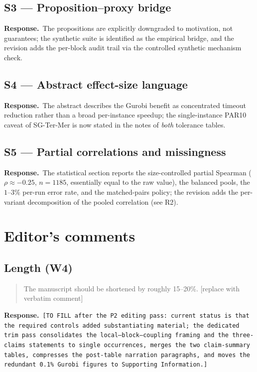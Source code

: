\documentclass[11pt]{article}
\newenvironment{reviewerquote}%
  {\medskip\noindent\color{quotegray}\itshape\begin{quotation}\noindent}%
  {\end{quotation}\medskip}
\newcommand{\resp}{\noindent\textbf{Response.}\ }
\begin{document}
\subsection*{S3 --- Proposition--proxy bridge}
\resp The propositions are explicitly downgraded to motivation, not guarantees; the
synthetic suite is identified as the empirical bridge, and the revision adds the
per-block audit trail via the controlled synthetic mechanism check.

\subsection*{S4 --- Abstract effect-size language}
\resp The abstract describes the Gurobi benefit as concentrated timeout reduction rather
than a broad per-instance speedup; the single-instance PAR10 caveat of SG-Ter-Mer is now
stated in the notes of \emph{both} tolerance tables.

\subsection*{S5 --- Partial correlations and missingness}
\resp The statistical section reports the size-controlled partial Spearman
($\rho\approx-0.25$, $n=1185$, essentially equal to the raw value), the balanced pools,
the $1$--$3\%$ per-run error rate, and the matched-pairs policy; the revision adds the
per-variant decomposition of the pooled correlation (see R2).

\section*{Editor's comments}

\subsection*{Length (W4)}
\begin{reviewerquote}
The manuscript should be shortened by roughly 15--20\%. [replace with verbatim comment]
\end{reviewerquote}
\resp \texttt{[TO FILL after the P2 editing pass: current status is that the required
controls added substantiating material; the dedicated trim pass consolidates the
local--block--coupling framing and the three-claims statements to single occurrences,
merges the two claim-summary tables, compresses the post-table narration paragraphs, and
moves the redundant 0.1\% Gurobi figures to Supporting Information.]}
\end{document}
